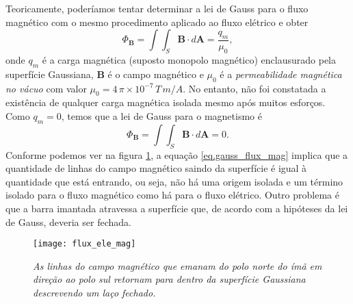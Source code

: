 Teoricamente, poderíamos tentar determinar a lei de Gauss para o fluxo magnético com o mesmo procedimento aplicado ao fluxo elétrico e obter
\begin{equation*}
\Phi_\textbf{B}=\int\int_S\textbf{B}\cdot\textit{d}\textbf{A}=\frac{q_m}{\mu_0},
\end{equation*} 
onde $q_m$ é a carga magnética (suposto monopolo magnético) enclausurado pela superfície Gaussiana, $\mathbf{B}$ é o campo magnético e $\mu_0$ é a \textit{permeabilidade magnética no vácuo} com valor $\mu_0=4\,\pi\times 10^{-7}\, T\,m/A$. No entanto, não foi constatada a existência de qualquer carga magnética isolada mesmo após muitos esforços. Como $q_m=0$, temos que a lei de Gauss para o magnetismo é
\begin{equation}\label{eq.gauss_flux_mag}
\Phi_\textbf{B}=\int\int_S\textbf{B}\cdot\textit{d}\textbf{A}=0.
\end{equation}
Conforme podemos ver na figura \ref{fig.flux_elet_magn}, a equação \ref{eq.gauss_flux_mag} implica que a quantidade de linhas do campo magnético saindo da superfície é igual à quantidade que está entrando, ou seja, não há uma origem isolada e um término isolado para o fluxo magnético como há para o fluxo elétrico. Outro problema é que a barra imantada atravessa a superfície que, de acordo com a hipóteses da lei de Gauss, deveria ser fechada.
\begin{figure}[!htb]
\centering
\texttt{[image: flux\_ele\_mag]}
\caption{\textit{As linhas do campo magnético que emanam do polo norte do ímã em direção ao polo sul retornam para dentro da superfície Gaussiana descrevendo um laço fechado.}}
\label{fig.flux_elet_magn}
\end{figure}

